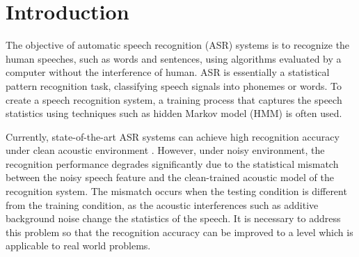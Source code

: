 \chapter{Introduction}
\label{chap:introduction}



The objective of automatic speech recognition (ASR) systems is to
recognize the human speeches, such as words and sentences, using
algorithms evaluated by a computer without the interference of
human. ASR is essentially a statistical pattern recognition task,
classifying speech signals into phonemes or words. To create a
speech recognition system, a training process that captures the
speech statistics using techniques such as hidden Markov model (HMM)
\cite{RabinaHMM} is often used.

Currently, state-of-the-art ASR systems can achieve high recognition
accuracy under clean acoustic environment \cite{cox00forecast}.
However, under noisy environment, the recognition performance
degrades significantly due to the statistical mismatch between the
noisy speech feature and the clean-trained acoustic model of the
recognition system. The mismatch occurs when the testing condition
is different from the training condition, as the acoustic
interferences such as additive background noise change the
statistics of the speech. It is necessary to address this problem so
that the recognition accuracy can be improved to a level which is
applicable to real world problems.

